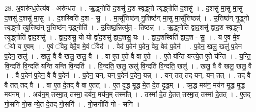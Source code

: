 \documentclass[17pt]{extarticle}
\begin{document}
28. अ॒वारु॑न्ध॒तेत्य॑व - अरु॑न्धत । . ऋ॒द्ध्नोति॑ द॒शसु॑ द॒श स्वृ॒द्ध्नो त्यृ॒द्ध्नोति॑ द॒शसु॑ । . द॒शसु॑ मा॒सु मा॒सु द॒शसु॑ द॒शसु॑ मा॒सु । . द॒शस्विति॑ द॒श - सु॒ । . मा॒सू᳚त्तिष्ठ॑न् नु॒त्तिष्ठ॑न् मा॒सु मा॒सू᳚त्तिष्ठन्न्॑ । . उ॒त्तिष्ठ॑न् नृ॒द्ध्नो त्यृ॒द्ध्नो त्यु॒त्तिष्ठ॑न् नु॒त्तिष्ठ॑न् नृ॒द्ध्नोति॑ । . उ॒त्तिष्ठ॒न्नित्यु॑त् - तिष्ठन्न्॑ । . ऋ॒द्ध्नोति॑ द्वाद॒शसु॑ द्वाद॒श स्वृ॒द्ध्नो त्यृ॒द्ध्नोति॑ द्वाद॒शसु॑ । . द्वा॒द॒शसु॒ यो यो द्वा॑द॒शसु॑ द्वाद॒शसु॒ यः । . द्वा॒द॒शस्विति॑ द्वाद॒श - सु॒ । . य ए॒व मे॒वं ॅयो य ए॒वम् । . ए॒वं ॅवेद॒ वेदै॒व मे॒वं ॅवेद॑ । . वेद॑ प॒देन॑ प॒देन॒ वेद॒ वेद॑ प॒देन॑ । . प॒देन॒ खलु॒ खलु॑ प॒देन॑ प॒देन॒ खलु॑ । . खलु॒ वै वै खलु॒ खलु॒ वै । . वा ए॒त ए॒ते वै वा ए॒ते । . ए॒ते य॑न्ति यन्त्ये॒त ए॒ते य॑न्ति । . य॒न्ति॒ वि॒न्दति॑ वि॒न्दति॑ यन्ति यन्ति वि॒न्दति॑ । . वि॒न्दति॒ खलु॒ खलु॑ वि॒न्दति॑ वि॒न्दति॒ खलु॑ । . खलु॒ वै वै खलु॒ खलु॒ वै । . वै प॒देन॑ प॒देन॒ वै वै प॒देन॑ । . प॒देन॒ यन्. यन् प॒देन॑ प॒देन॒ यन्न् । . यन् तत् तद् यन्. यन् तत् । . तद् वै वै तत् तद् वै । . वा ए॒त दे॒तद् वै वा ए॒तत् । . ए॒त दृ॒द्ध मृ॒द्ध मे॒त दे॒त दृ॒द्धम् । . ऋ॒द्ध मय॑न॒ मय॑न मृ॒द्ध मृ॒द्ध मय॑नम् । . अय॑न॒म् तस्मा॒त् तस्मा॒ दय॑न॒ मय॑न॒म् तस्मा᳚त् । . तस्मा॑ दे॒त दे॒तत् तस्मा॒त् तस्मा॑ दे॒तत् । . ए॒तद् गो॒सनि॑ गो॒स न्ये॒त दे॒तद् गो॒सनि॑ । . गो॒सनीति॑ गो - सनि॑ । \newline
\end{document}
